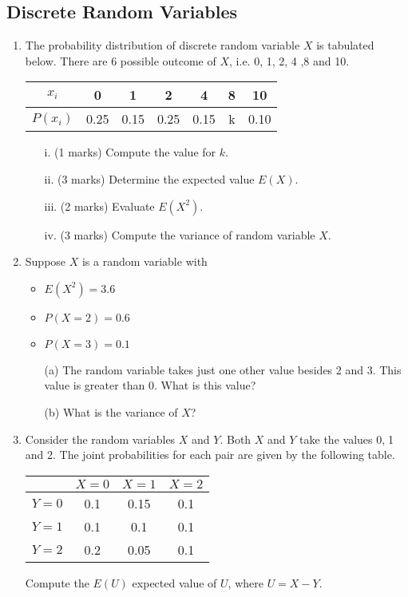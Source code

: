 \documentclass[]{report}
\begin{document}
\subsection{Discrete Random Variables}
\begin{enumerate}
	\item  The probability distribution of discrete random variable $X$ is tabulated below. There are 6 possible outcome of $X$, i.e. 0, 1, 2, 4 ,8 and 10.
	\begin{center}
		\begin{tabular}{|c||c|c|c|c|c|c|}
			\hline
			$x_i$  & 0 & 1 & 2 & 4 & 8 & 10 \\\hline
			$P(x_i)$ & 0.25 & 0.15 & 0.25 & 0.15 & k & 0.10\\
			\hline
		\end{tabular}
	\end{center}
	
	\begin{itemize}
		\item[i.] (1 marks) Compute the value for $k$.
		\item[ii.] (3 marks) Determine the expected value $E(X)$.
		\item[iii.] (2 marks) Evaluate $E(X^2)$.
		\item[iv.] (3 marks) Compute the variance of random variable $X$.
	\end{itemize}
	\item 
	Suppose $X$ is a random variable with 
	\begin{itemize}
		\item $E(X^2)=3.6$
		\item $P(X=2)=0.6$
		\item $P(X=3)=0.1$
	\end{itemize}
	
	\begin{itemize}
		\item[(a)] The random variable takes just one other value besides 2 and 3. This value is greater than 0. What is this value?
		\item[(b)] What is the variance of $X$?
	\end{itemize}
	
	
	\item Consider the random variables $X$ and $Y$. Both $X$ and $Y$ take the values 0,$\;$1 and 2. 
	The joint probabilities for each pair are given by the following table.
	\begin{center}
		\begin{tabular}{|c|c|c|c|}
			\hline  & $X=0$ & $X=1$ & $X=2$ \\ 
			\hline $Y=0$ & 0.1 & 0.15 & 0.1 \\ 
			\hline $Y=1$ & 0.1 & 0.1 & 0.1 \\ 
			\hline $Y=2$ & 0.2 & 0.05 & 0.1 \\ 
			\hline 
		\end{tabular} 
	\end{center}
	Compute the $E(U)$ expected value of $U$, where $U=X-Y$.
\end{enumerate}
\end{document}
